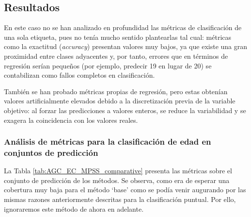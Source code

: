 
\subsection{Resultados}

En este caso no se han analizado en profundidad las métricas de clasificación de una sola etiqueta, pues no tenía mucho sentido plantearlas tal cual: métricas como la exactitud (\textit{accuracy}) presentan valores muy bajos, ya que existe una gran proximidad entre clases adyacentes y, por tanto, errores que en términos de regresión serían pequeños (por ejemplo, predecir 19 en lugar de 20) se contabilizan como fallos completos en clasificación.

También se han probado métricas propias de regresión, pero estas obtenían valores artificialmente elevados debido a la discretización previa de la variable objetivo: al forzar las predicciones a valores enteros, se reduce la variabilidad y se exagera la coincidencia con los valores reales.


\subsubsection{Análisis de métricas para la clasificación de edad en conjuntos de predicción}

La Tabla \ref{tab:AGC_EC_MPSS_comparative} presenta las métricas sobre el conjunto de predicción de los métodos. Se observa, como era de esperar una cobertura muy baja para el método `base' como se podía venir augurando por las mismas razones anteriormente descritas para la clasificación puntual. Por ello, ignoraremos este método de ahora en adelante.

